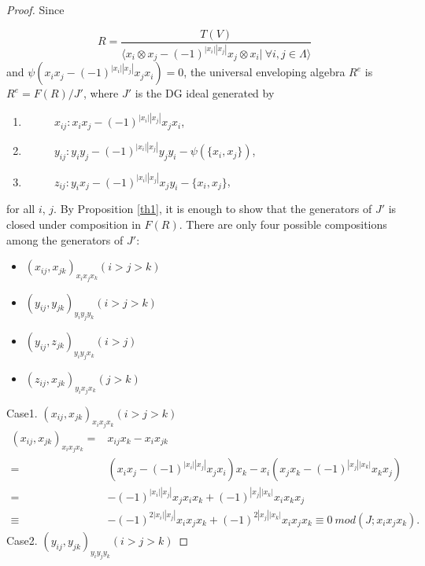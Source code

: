 \documentclass[a4paper,10pt]{amsart}
\theoremstyle{definition}
\theoremstyle{remark}
\numberwithin{equation}{section}
\begin{document}
\begin{proof}
Since

$$R=\frac{T(V)}{\langle x_{i}\otimes
x_{j}-(-1)^{|x_{i}||x_{j}|}x_{j}\otimes x_{i}| ~\forall i, j
\in\Lambda \rangle}$$
and $\psi(x_ix_j-(-1)^{|x_{i}||x_{j}|}x_jx_i)=0$, the universal
enveloping algebra $R^{e}$ is $R^{e}=F(R)/J'$, where $J'$ is the DG
ideal generated by
\begin{center}
\begin{enumerate}
  \item $~~~~~~~~~~~~x_{ij}: x_ix_j-(-1)^{|x_{i}||x_{j}|}x_jx_i$,
  \item $~~~~~~~~~~~~y_{ij}: y_iy_j-(-1)^{|x_i||x_j|}y_jy_i-\psi(\{x_i, x_j\})$,
  \item $~~~~~~~~~~~~z_{ij}: y_ix_j-(-1)^{|x_i||x_j|}x_jy_i-\{x_i, x_j\}$,
\end{enumerate}
\end{center}
for all $i$, $j$. By Proposition \ref{th1}, it is enough to show that the
generators of $J'$ is closed under composition in $F(R)$. There are
only four possible compositions among the generators of $J'$:
\begin{itemize}
  \item $(x_{ij}, x_{jk})_{x_ix_jx_k}(i>j>k)$
  \item $(y_{ij}, y_{jk})_{y_iy_jy_k}(i>j>k)$
  \item $(y_{ij}, z_{jk})_{y_iy_jx_k}(i>j)$
  \item $(z_{ij}, x_{jk})_{y_ix_jx_k}(j>k)$
\end{itemize}
Case1. $(x_{ij}, x_{jk})_{x_ix_jx_k}(i>j>k)$
\begin{align*}
(x_{ij}, x_{jk})_{x_ix_jx_k}=&x_{ij}x_k-x_ix_{jk}\\
=&(x_ix_j-(-1)^{|x_{i}||x_{j}|}x_jx_i)x_k-x_i(x_jx_k-(-1)^{|x_{j}||x_{k}|}x_kx_j)\\
=&-(-1)^{|x_{i}||x_{j}|}x_jx_ix_k+(-1)^{|x_{j}||x_{k}|}x_ix_kx_j\\
\equiv&-(-1)^{2|x_{i}||x_{j}|}x_ix_jx_k+(-1)^{2|x_{j}||x_{k}|}x_ix_jx_k\equiv 0
~mod (J; x_ix_jx_k).
\end{align*}
Case2. $(y_{ij}, y_{jk})_{y_iy_jy_k}(i>j>k)$


\end{proof}
\end{document}
